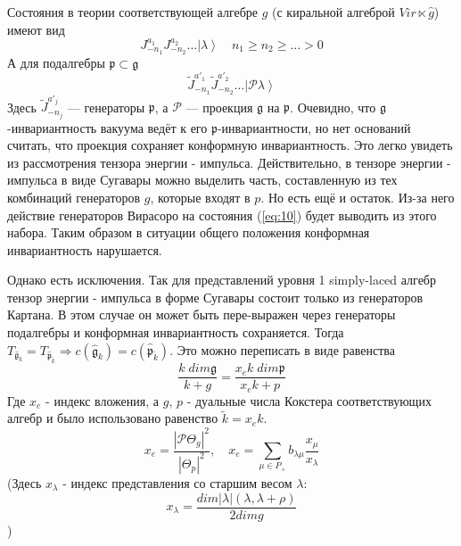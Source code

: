 \documentclass[a4paper,12pt]{article}
\theoremstyle{definition} \newtheorem{Def}{Definition}
\begin{document}
Состояния в теории соответствующей алгебре $g$ (с киральной алгеброй $Vir\ltimes \hat g$) имеют вид
\begin{equation}
  \label{eq:9}
  J^{a_1}_{-n_1}J^{a_2}_{-n_2}\dots\left|\lambda\right>\quad n_1\geq n_2\geq\dots>0
\end{equation}
А для подалгебры $\mathfrak{p}\subset\mathfrak{g}$
\begin{equation}
  \label{eq:10}
  \tilde{J}^{a'_1}_{-n_1}\tilde{J}^{a'_2}_{-n_2}\dots\left|\mathcal{P}\lambda\right>
\end{equation}
Здесь $\tilde{J}^{a'_j}_{-n_j}$ --- генераторы $\mathfrak{p}$, а $\mathcal{P}$ --- проекция $\mathfrak{g}$ на $\mathfrak{p}$. Очевидно, что $\mathfrak{g}$-инвариантность вакуума ведёт к его $\mathfrak{p}$-инвариантности, но нет оснований считать, что проекция сохраняет конформную инвариантность. Это легко увидеть из рассмотрения тензора энергии - импульса. Действительно, в тензоре энергии - импульса в виде Сугавары можно выделить часть, составленную из тех комбинаций генераторов $g$, которые входят в $p$. Но есть ещё и остаток. Из-за него действие генераторов Вирасоро на состояния (\ref{eq:10}) будет выводить из этого набора.
Таким образом в ситуации общего положения конформная инвариантность нарушается.

Однако есть исключения. Так для представлений уровня 1 simply-laced алгебр тензор энергии - импульса в форме Сугавары состоит только из генераторов Картана. В этом случае он может быть пере-выражен через генераторы подалгебры и конформная инвариантность сохраняется. Тогда $T_{\hat{\mathfrak{g}}_k}=T_{\hat{\mathfrak{p}}_{\tilde k}}\Rightarrow c(\hat{\mathfrak{g}}_k)=c(\hat{\mathfrak{p}}_{\tilde k})$. Это можно переписать в виде равенства
\begin{equation}
  \label{eq:11}
  \frac{k\;dim\mathfrak{g}}{k+g}=\frac{x_e k\; dim\mathfrak{p}}{x_ek+p}
\end{equation}
Где $x_e$ - индекс вложения, а $g$, $p$ - дуальные числа Кокстера соответствующих алгебр и было использовано равенство $\tilde k=x_e k$.
\begin{equation}
  \label{eq:12}
  x_e=\frac{\left|\mathcal{P}\Theta_g\right|^2}{\left| \Theta_p\right|^2},\quad
  x_e=\sum_{\mu\in P_{+}}b_{\lambda\mu}\frac{x_{\mu}}{x_{\lambda}}
\end{equation}
(Здесь $x_{\lambda}$ - индекс представления со старшим весом $\lambda$:
\begin{equation}
  \label{eq:13}
  x_{\lambda}=\frac{dim \left|\lambda\right|(\lambda,\lambda+\rho)}{2 dim g}
\end{equation})
\end{document}
